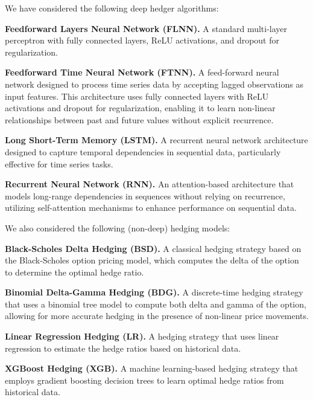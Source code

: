       We have considered the following deep hedger algorithms:
      \begin{enumerate}[label=\textbf{[H\arabic*]}]
        \item \label{hedger:feedforwardlag} \textbf{Feedforward Layers
        Neural 
        Network (FLNN).} A standard multi-layer perceptron with 
        fully connected layers, ReLU activations, and dropout for 
        regularization.

        \item \label{hedger:feedforward} \textbf{Feedforward Time
        Neural Network (FTNN).} A feed-forward neural network designed 
          to process time series data by accepting lagged observations 
          as input features. This architecture uses fully connected 
          layers with ReLU activations and dropout for regularization, 
          enabling it to learn non-linear relationships between past 
          and future values without explicit recurrence.
        
        \item \label{hedger:lstm} \textbf{Long Short-Term Memory 
        (LSTM).} A recurrent neural network architecture designed 
        to capture temporal dependencies in sequential data, 
        particularly effective for time series tasks.
        
        \item \label{hedger:rnn} \textbf{Recurrent Neural Network (RNN).}
        An attention-based architecture that models long-range 
        dependencies in sequences without relying on recurrence, 
        utilizing self-attention mechanisms to enhance performance 
        on sequential data.
      
      \end{enumerate}
    
    We also considered the following (non-deep) hedging models:
    \begin{enumerate}[label=\textbf{[H\arabic*]}, resume]
      \item \label{hedger:black-scholes} \textbf{Black-Scholes 
      Delta Hedging (BSD).} A classical hedging strategy based on the 
      Black-Scholes option pricing model, which computes the 
      delta of the option to determine the optimal hedge ratio.

      \item \label{hedger:binomial} \textbf{Binomial Delta-Gamma Hedging (BDG).}
      A discrete-time hedging strategy that uses a binomial tree
      model to compute both delta and gamma of the option, allowing
      for more accurate hedging in the presence of non-linear price
      movements.

      \item \label{hedger:lreg} \textbf{Linear Regression Hedging (LR).} 
      A hedging strategy that uses linear regression to estimate 
      the hedge ratios based on historical data.

      \item \label{hedger:xgboost} \textbf{XGBoost Hedging (XGB).}
      A machine learning-based hedging strategy that employs
      gradient boosting decision trees to learn optimal hedge ratios
      from historical data.  
    \end{enumerate}

